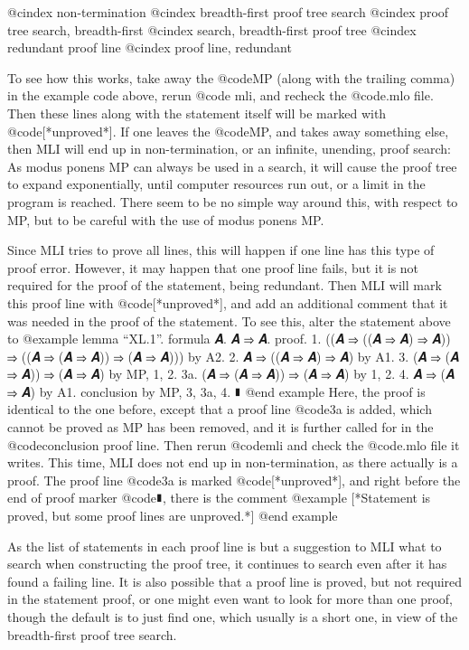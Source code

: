@cindex non-termination
@cindex breadth-first proof tree search
@cindex proof tree search, breadth-first
@cindex search, breadth-first proof tree
@cindex redundant proof line
@cindex proof line, redundant

To see how this works, take away the @code{MP} (along with the trailing comma) in the example code above, rerun @code {mli}, and recheck the @code{.mlo} file. Then these lines along with the statement itself will be marked with @code{[*unproved*]}. If one leaves the @code{MP}, and takes away something else, then MLI will end up in non-termination, or an infinite, unending, proof search: As modus ponens MP can always be used in a search, it will cause the proof tree to expand exponentially, until computer resources run out, or a limit in the program is reached. There seem to be no simple way around this, with respect to MP, but to be careful with the use of modus ponens MP.

Since MLI tries to prove all lines, this will happen if one line has this type of proof error. However, it may happen that one proof line fails, but it is not required for the proof of the statement, being redundant. Then MLI will mark this proof line with @code{[*unproved*]}, and add an additional comment that it was needed in the proof of the statement. To see this, alter the statement above to
@example
lemma “XL.1”. formula 𝑨. 𝑨 ⇒ 𝑨.
proof.
  1. ((𝑨 ⇒ ((𝑨 ⇒ 𝑨) ⇒ 𝑨)) ⇒ ((𝑨 ⇒ (𝑨 ⇒ 𝑨)) ⇒ (𝑨 ⇒ 𝑨))) by A2.
  2. 𝑨 ⇒ ((𝑨 ⇒ 𝑨) ⇒ 𝑨) by A1.
  3. (𝑨 ⇒ (𝑨 ⇒ 𝑨)) ⇒ (𝑨 ⇒ 𝑨) by MP, 1, 2.
  3a. (𝑨 ⇒ (𝑨 ⇒ 𝑨)) ⇒ (𝑨 ⇒ 𝑨) by 1, 2.
  4. 𝑨 ⇒ (𝑨 ⇒ 𝑨) by A1.
  conclusion by MP, 3, 3a, 4.
∎
@end example
Here, the proof is identical to the one before, except that a proof line @code{3a} is added, which cannot be proved as MP has been removed, and it is further called for in the @code{conclusion} proof line. Then rerun @code{mli} and check the @code{.mlo} file it writes. This time, MLI does not end up in non-termination, as there actually is a proof. The proof line @code{3a} is marked @code{[*unproved*]}, and right before the end of proof marker @code{∎}, there is the comment
@example
[*Statement is proved, but some proof lines are unproved.*]
@end example

As the list of statements in each proof line is but a suggestion to MLI what to search when constructing the proof tree, it continues to search even after it has found a failing line. It is also possible that a proof line is proved, but not required in the statement proof, or one might even want to look for more than one proof, though the default is to just find one, which usually is a short one, in view of the breadth-first proof tree search.

